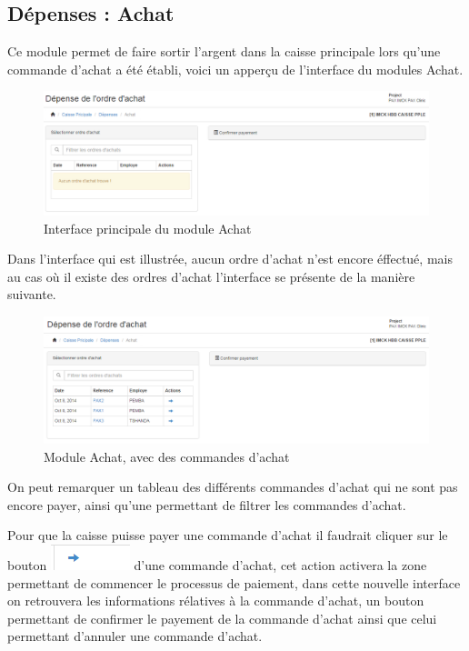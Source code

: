 \documentclass[12pt,a4paper]{report}
\begin{document}
\newpage
\subsection{Dépenses : Achat}
Ce module permet de faire sortir l'argent dans la caisse principale lors qu'une commande d'achat a été établi, voici un apperçu de l'interface du modules Achat.

\begin{figure}[h]
\begin{center}
\includegraphics[width=14cm]{pic/Achat.png}
\end{center}
\caption{Interface principale du module Achat}
\label{Interface principale du module Achat}
\end{figure}

Dans l'interface qui est illustrée, aucun ordre d'achat n'est encore éffectué, mais au cas où il existe des ordres d'achat l'interface se présente de la manière suivante.

\begin{figure}[h]
\begin{center}
\includegraphics[width=14cm]{pic/Achat2.png}
\end{center}
\caption{Module Achat, avec des commandes d'achat}
\label{Module Achat, avec des commandes d'achat}
\end{figure}

On peut remarquer un tableau des différents commandes d'achat qui ne sont pas encore payer, ainsi qu'une permettant de filtrer les commandes d'achat. 

\newpage
Pour que la caisse puisse payer une commande d'achat il faudrait cliquer sur le bouton \includegraphics[scale=0.7]{pic/SelectedPOrder.png} d'une commande d'achat, cet action activera la zone permettant de commencer le processus de paiement, dans cette nouvelle interface on retrouvera les informations rélatives à la commande d'achat, un bouton permettant de confirmer le payement de la commande d'achat ainsi que celui permettant d'annuler une commande d'achat.
\end{document}
